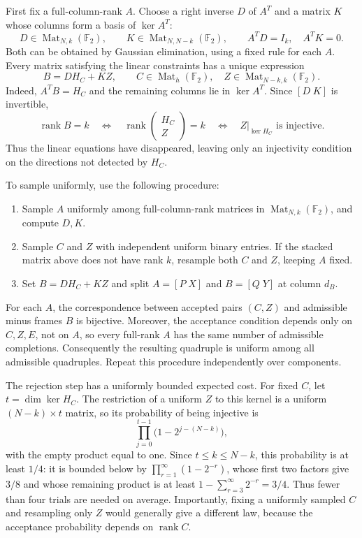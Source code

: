 \documentclass[11pt]{article}
\begin{document}
First fix a full-column-rank $A$. Choose a right inverse $D$ of $A^T$ and a matrix $K$ whose columns form a basis of $\ker A^T$:
\[
D\in\operatorname{Mat}_{N,k}(\mathbb F_2),\qquad
K\in\operatorname{Mat}_{N,N-k}(\mathbb F_2),\qquad
A^TD=I_k,\quad A^TK=0.
\]
Both can be obtained by Gaussian elimination, using a fixed rule for each $A$. Every matrix satisfying the linear constraints has a unique expression
\[
\boxed{B=DH_C+KZ},\qquad
C\in\operatorname{Mat}_h(\mathbb F_2),\quad
Z\in\operatorname{Mat}_{N-k,k}(\mathbb F_2).
\]
Indeed, $A^TB=H_C$ and the remaining columns lie in $\ker A^T$. Since $[D\;K]$ is invertible,
\[
\operatorname{rank}B=k
\quad\Longleftrightarrow\quad
\operatorname{rank}\begin{pmatrix}H_C\\Z\end{pmatrix}=k
\quad\Longleftrightarrow\quad
Z|_{\ker H_C}\text{ is injective}.
\]
Thus the linear equations have disappeared, leaving only an injectivity condition on the directions not detected by $H_C$.

To sample uniformly, use the following procedure:
\begin{enumerate}
\item Sample $A$ uniformly among full-column-rank matrices in $\operatorname{Mat}_{N,k}(\mathbb F_2)$, and compute $D,K$.
\item Sample $C$ and $Z$ with independent uniform binary entries. If the stacked matrix above does not have rank $k$, resample both $C$ and $Z$, keeping $A$ fixed.
\item Set $B=DH_C+KZ$ and split $A=[P\;X]$ and $B=[Q\;Y]$ at column $d_B$.
\end{enumerate}
For each $A$, the correspondence between accepted pairs $(C,Z)$ and admissible minus frames $B$ is bijective. Moreover, the acceptance condition depends only on $C,Z,E$, not on $A$, so every full-rank $A$ has the same number of admissible completions. Consequently the resulting quadruple is uniform among all admissible quadruples. Repeat this procedure independently over components.

The rejection step has a uniformly bounded expected cost. For fixed $C$, let $t=\dim\ker H_C$. The restriction of a uniform $Z$ to this kernel is a uniform $(N-k)\times t$ matrix, so its probability of being injective is
\[
\prod_{j=0}^{t-1}\bigl(1-2^{j-(N-k)}\bigr),
\]
with the empty product equal to one. Since $t\le k\le N-k$, this probability is at least $1/4$: it is bounded below by $\prod_{r=1}^{\infty}(1-2^{-r})$, whose first two factors give $3/8$ and whose remaining product is at least $1-\sum_{r=3}^{\infty}2^{-r}=3/4$. Thus fewer than four trials are needed on average. Importantly, fixing a uniformly sampled $C$ and resampling only $Z$ would generally give a different law, because the acceptance probability depends on $\operatorname{rank}C$.
\end{document}
